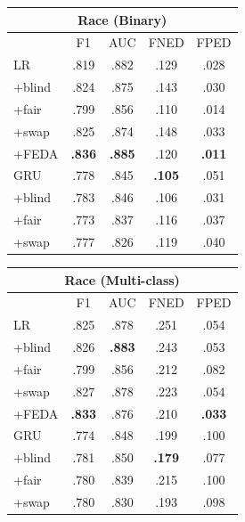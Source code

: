 \begin{table}[tb!]
\begin{tabular}{l||cc|cc}
\multicolumn{5}{c}{\bf Race (Binary)} \\\hline
&F1&AUC&FNED&FPED\\\hline\hline
LR& .819 & .882 & .129 & .028\\
+blind& .824 & .875 & .143 & .030\\
+fair& .799 & .856 & .110 & .014 \\
+swap& .825 & .874 & .148 & .033  \\
+FEDA& \bf .836 & \bf .885 & .120 & \bf .011 \\
\hline
GRU& .778 & .845 & \bf .105 & .051 \\
+blind& .783 & .846 & .106 & .031\\
+fair& .773 & .837 & .116 & .037\\
+swap& .777 & .826 & .119 & .040 \\\hline
\end{tabular}
\quad
\begin{tabular}{l||cc|cc}
\multicolumn{5}{c}{\bf Race (Multi-class)} \\\hline
&F1&AUC&FNED&FPED\\\hline\hline
LR& .825 & .878 & .251 & .054 \\
+blind& .826 & \bf .883 & .243 & .053 \\
+fair& .799 & .856 & .212 & .082 \\
+swap& .827 & .878 & .223 & .054 \\
+FEDA& \bf .833 & .876 & .210 & \bf .033\\\hline
GRU& .774 & .848 & .199 & .100\\
+blind& .781 & .850 & \bf .179 & .077\\
+fair& .780 & .839 & .215 & .100\\
+swap& .780 & .830 & .193 & .098 \\\hline
\end{tabular}


\end{table}

